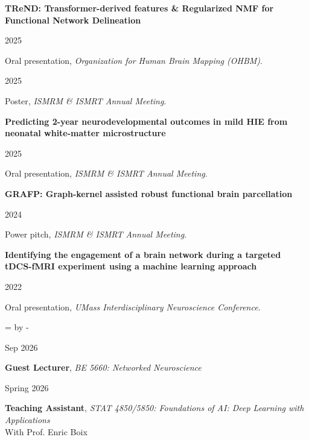 \documentclass[11pt,letterpaper]{article}
\newlength{\datewidth}\setlength{\datewidth}{1.45in} %
\newlength{\contentwidth}
\newcommand{\reservelines}[1]{\par\begingroup\dimen0=\pagegoal\advance\dimen0 by -\pagetotal\ifdim\dimen0<#1\newpage\fi\endgroup}
\newcommand{\cvsection}[1]{%
  \reservelines{7\baselineskip}%
  \par\addvspace{5pt}\noindent%
  {\large\color{headgray}\textls[140]{\MakeUppercase{#1}}}%
  \par\nointerlineskip\vspace{5pt}\noindent{\color{rulegray}\hrule height 0.6pt}\par\addvspace{5pt}%
}
\newlength{\compactdatewidth}\setlength{\compactdatewidth}{0.9in}
\newlength{\compactsep}\setlength{\compactsep}{0.08in}
\newlength{\compactcontentwidth}
\newcommand{\datedcompact}[2]{%
  \par\vspace{3pt}\noindent
  \begin{minipage}[t]{\compactdatewidth}\RaggedRight\small #1\strut\end{minipage}%
  \hspace{\compactsep}%
  \begin{minipage}[t]{\compactcontentwidth}#2\strut\end{minipage}\par%
}
\newlength{\talkdatewidth}\setlength{\talkdatewidth}{0.55in}
\newlength{\talksep}\setlength{\talksep}{0.06in}
\newlength{\talkcontentwidth}
\newcommand{\talkindent}{\dimexpr\talkdatewidth+\talksep\relax}
\newcommand{\talktitle}[1]{%
  \par\addvspace{1pt}\noindent\hspace*{\talkindent}%
  \begin{minipage}[t]{\talkcontentwidth}\textbf{#1}\strut\end{minipage}\par\nobreak\vspace{1pt}%
}
\newcommand{\talkdated}[2]{%
  \par\vspace{3pt}\noindent
  \begin{minipage}[t]{\talkdatewidth}\RaggedRight\small #1\strut\end{minipage}%
  \hspace{\talksep}%
  \begin{minipage}[t]{\talkcontentwidth}#2\strut\end{minipage}\par%
}
\begin{document}
\talktitle{TReND: Transformer-derived features \& Regularized NMF for Functional Network Delineation}
\talkdated{2025}{Oral presentation, \textit{Organization for Human Brain Mapping (OHBM)}.}
\talkdated{2025}{Poster, \textit{ISMRM \& ISMRT Annual Meeting}.}

\talktitle{Predicting 2-year neurodevelopmental outcomes in mild HIE from neonatal white-matter microstructure}
\talkdated{2025}{Oral presentation, \textit{ISMRM \& ISMRT Annual Meeting}.}

\talktitle{GRAFP: Graph-kernel assisted robust functional brain parcellation}
\talkdated{2024}{Power pitch, \textit{ISMRM \& ISMRT Annual Meeting}.}

\talktitle{Identifying the engagement of a brain network during a targeted tDCS-fMRI experiment using a machine learning approach}
\talkdated{2022}{Oral presentation, \textit{UMass Interdisciplinary Neuroscience Conference}.}


\cvsection{Teaching}
\datedcompact{Sep 2026}{%
  \textbf{Guest Lecturer}, \textit{BE 5660: Networked Neuroscience}}

\datedcompact{Spring 2026}{%
  \textbf{Teaching Assistant}, \textit{STAT 4850/5850: Foundations of AI: Deep Learning with Applications}\\
  With Prof. Enric Boix}
\end{document}
